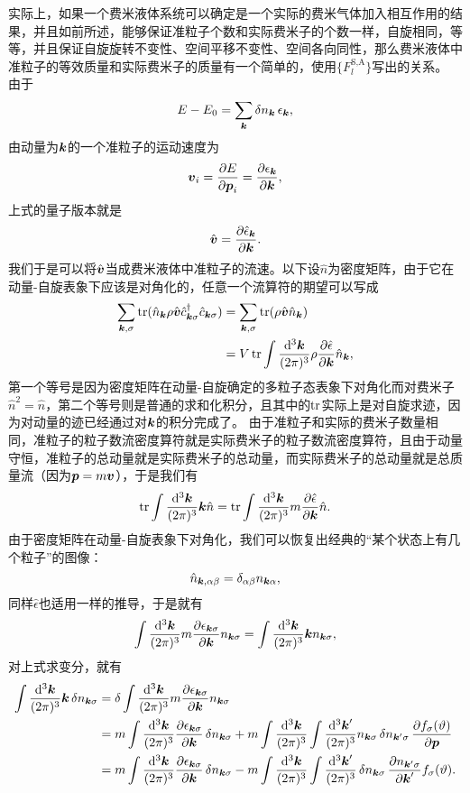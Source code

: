 \documentclass[hyperref, UTF8, a4paper]{ctexart}
\begin{document}
实际上，如果一个费米液体系统可以确定是一个实际的费米气体加入相互作用的结果，并且如前所述，能够保证准粒子个数和实际费米子的个数一样，自旋相同，等等，并且保证自旋旋转不变性、空间平移不变性、空间各向同性，那么费米液体中准粒子的等效质量和实际费米子的质量有一个简单的，使用$\{F_l^\text{S,A}\}$写出的关系。
由于
\[
    E - E_0 = \sum_{\vb*{k}} \var{n_{\vb*{k}}} \epsilon_{\vb*{k}},
\]
由动量为$\vb*{k}$的一个准粒子的运动速度为
\[
    \vb*{v}_i = \pdv{E}{\vb*{p}_i} = \pdv{\epsilon_{\vb*{k}}}{\vb*{k}},
\]
上式的量子版本就是
\[
    \hat{\vb*{v}} = \pdv{\hat{\epsilon}_{\vb*{k}}}{\vb*{k}}.
\]
我们于是可以将$\hat{\vb*{v}}$当成费米液体中准粒子的流速。以下设$\hat{n}$为密度矩阵，由于它在动量-自旋表象下应该是对角化的，任意一个流算符的期望可以写成
\[
    \begin{aligned}
        \sum_{\vb*{k}, \sigma} \trace(\hat{n}_{\vb*{k}} \rho \hat{\vb*{v}} \hat{c}^\dagger_{\vb*{k} \sigma} \hat{c}_{\vb*{k} \sigma}) &= \sum_{\vb*{k}, \sigma} \trace(\rho \hat{\vb*{v}} \hat{n}_{\vb*{k}}) \\
        &= V \trace \int \frac{\dd[3]{\vb*{k}}}{(2\pi)^3} \rho \pdv{\hat{\epsilon}}{\vb*{k}} \hat{n}_{\vb*{k}}, 
    \end{aligned}
\]
第一个等号是因为密度矩阵在动量-自旋确定的多粒子态表象下对角化而对费米子$\hat{n}^2=\hat{n}$，第二个等号则是普通的求和化积分，且其中的$\trace$实际上是对自旋求迹，因为对动量的迹已经通过对$\vb*{k}$的积分完成了。
由于准粒子和实际的费米子数量相同，准粒子的粒子数流密度算符就是实际费米子的粒子数流密度算符，且由于动量守恒，准粒子的总动量就是实际费米子的总动量，而实际费米子的总动量就是总质量流（因为$\vb*{p}=m\vb*{v}$），于是我们有
\[
    \trace \int \frac{\dd[3]{\vb*{k}}}{(2\pi)^3} \vb*{k} \hat{n} = \trace \int \frac{\dd[3]{\vb*{k}}}{(2\pi)^3} m \pdv{\hat{\epsilon}}{\vb*{k}} \hat{n}.
\]
由于密度矩阵在动量-自旋表象下对角化，我们可以恢复出经典的“某个状态上有几个粒子”的图像：
\[
    \hat{n}_{\vb*{k}, \alpha \beta} = \delta_{\alpha \beta} n_{\vb*{k} \alpha},
\]
同样$\hat{\epsilon}$也适用一样的推导，于是就有
\[
    \int \frac{\dd[3]{\vb*{k}}}{(2\pi)^3} m \pdv{\epsilon_{\vb*{k} \sigma}}{\vb*{k}} n_{\vb*{k} \sigma} = \int \frac{\dd[3]{\vb*{k}}}{(2\pi)^3} \vb*{k} n_{\vb*{k} \sigma},
\]
对上式求变分，就有
\[
    \begin{aligned}
        \int \frac{\dd[3]{\vb*{k}}}{(2\pi)^3} \vb*{k} \var{n_{\vb*{k} \sigma}} &= \var \int \frac{\dd[3]{\vb*{k}}}{(2\pi)^3} m \pdv{\epsilon_{\vb*{k} \sigma}}{\vb*{k}} n_{\vb*{k} \sigma} \\
        &= m \int \frac{\dd[3]{\vb*{k}}}{(2\pi)^3} \pdv{\epsilon_{\vb*{k} \sigma}}{\vb*{k}} \var{n_{\vb*{k} \sigma}} + m \int \frac{\dd[3]{\vb*{k}}}{(2\pi)^3} \int \frac{\dd[3]{\vb*{k}'}}{(2\pi)^3} n_{\vb*{k} \sigma} \var{n_{\vb*{k}' \sigma}} \pdv{f_{\sigma}(\vartheta)}{\vb*{p}} \\
        &= m \int \frac{\dd[3]{\vb*{k}}}{(2\pi)^3} \pdv{\epsilon_{\vb*{k} \sigma}}{\vb*{k}} \var{n_{\vb*{k} \sigma}} - m \int \frac{\dd[3]{\vb*{k}}}{(2\pi)^3} \int \frac{\dd[3]{\vb*{k}'}}{(2\pi)^3} \var{n_{\vb*{k} \sigma}} \pdv{n_{\vb*{k}' \sigma}}{\vb*{k}'} f_{\sigma}(\vartheta) .
    \end{aligned}
\]
\end{document}
